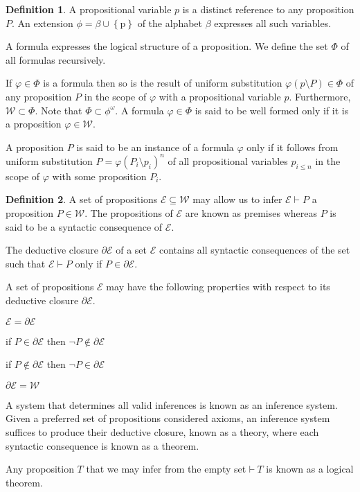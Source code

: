 \documentclass{amsbook}
\newcommand{\setsm}[1]{\left\{#1\right\}}
\newcommand{\wffs}{\mathcal W}
\newcommand{\infers}{\mathrel\vdash}
\newcommand{\theorem}{\mathord\vdash\medspace}
\theoremstyle{definition}
\newtheorem{dfn}{Definition}[section]
\begin{document}
\begin{dfn}
    A propositional variable $p$ is a distinct reference to any proposition $P$. An extension $\phi = \beta \cup \setsm{\mathrm p}$ of the alphabet $\beta$ expresses all such variables.

    A formula expresses the logical structure of a proposition. We define the set $\Phi$ of all formulas recursively.

    If $\varphi \in \Phi$ is a formula then so is the result of uniform substitution $\varphi(p \setminus P) \in \Phi$ of any proposition $P$ in the scope of $\varphi$ with a propositional variable $p$. Furthermore, $\wffs \subset \Phi$. Note that $\Phi \subset \phi^\omega$. A formula $\varphi \in \Phi$ is said to be well formed only if it is a proposition $\varphi \in \wffs$.

    A proposition $P$ is said to be an instance of a formula $\varphi$ only if it follows from uniform substitution $P = \varphi(P_i \setminus p_i)^n$ of all propositional variables $p_{i \leq n}$ in the scope of $\varphi$ with some proposition $P_i$.
\end{dfn}

\begin{dfn}
    A set of propositions $\mathcal E \subseteq \wffs$ may allow us to infer $\mathcal E \infers P$ a proposition $P \in \wffs$. The propositions of $\mathcal E$ are known as premises whereas $P$ is said to be a syntactic consequence of $\mathcal E$.

    The deductive closure $\partial \mathcal E$ of a set $\mathcal E$ contains all syntactic consequences of the set such that $\mathcal E \infers P$ only if $P \in \partial\mathcal E$.

    A set of propositions $\mathcal E$ may have the following properties with respect to its deductive closure $\partial\mathcal E$.
    \begin{enumerate}[
            labelindent=\parindent,
            before={
                    \renewcommand\makelabel[1]{(##1).}
                }
        ]
        \item[deductively closed] $\mathcal E = \partial\mathcal E$
        \item[consistent] if $P \in \partial\mathcal E$ then $\neg P \notin \partial\mathcal E$
        \item[complete] if $P \notin \partial\mathcal E$ then $\neg P \in \partial\mathcal E$
        \item[trivial] $\partial\mathcal E = \wffs$
    \end{enumerate}

    A system that determines all valid inferences is known as an inference system. Given a preferred set of propositions considered axioms, an inference system suffices to produce their deductive closure, known as a theory, where each syntactic consequence is known as a theorem.

    Any proposition $T$ that we may infer from the empty set $\theorem T$ is known as a logical theorem.
\end{dfn}
\end{document}
